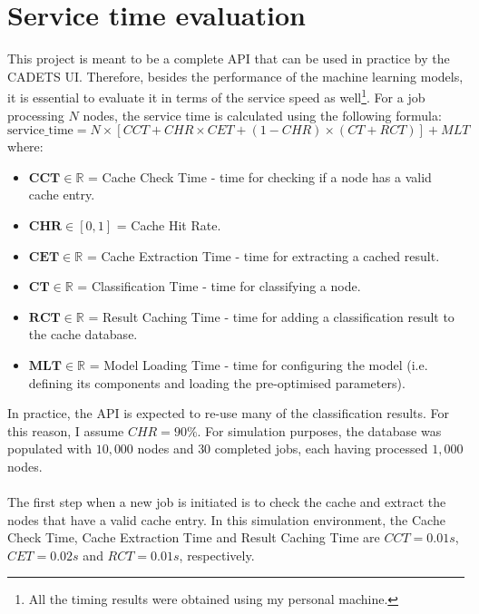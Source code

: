 		\section{Service time evaluation} \label{Section: eval/service-time}
			This project is meant to be a complete API that can be used in practice by the CADETS UI. Therefore, besides the performance of the machine learning models, it is essential to evaluate it in terms of the service speed as well\footnote{All the timing results were obtained using my personal machine.}. For a job processing $N$ nodes, the service time is calculated using the following formula:  
			\begin{equation}
				\text{service\_time} = N\times [CCT + CHR \times CET + (1-CHR) \times (CT + RCT)] + MLT
				\label{Eq: eval/service-time/overall}
			\end{equation}
			where: 
			\begin{itemize}
				\item $\mathbf{CCT} \in \mathbb{R}$ = Cache Check Time - time for checking if a node has a valid cache entry.
				\item $\mathbf{CHR} \in [0, 1]$ = Cache Hit Rate.
				\item $\textbf{CET} \in \mathbb{R}$ = Cache Extraction Time - time for extracting a cached result.
				\item $\textbf{CT} \in \mathbb{R}$ = Classification Time - time for classifying a node. 
				\item $\textbf{RCT} \in \mathbb{R}$ = Result Caching Time - time for adding a classification result to the cache database.
				\item $\mathbf{MLT} \in \mathbb{R}$ = Model Loading Time - time for configuring the model (i.e. defining its components and loading the pre-optimised parameters).
			\end{itemize}
			In practice, the API is expected to re-use many of the classification results. For this reason, I assume $CHR = 90\%$. For simulation purposes, the database was populated with $10, 000$ nodes and $30$ completed jobs, each having processed $1, 000$ nodes. 
			\\ \\
			The first step when a new job is initiated is to check the cache and extract the nodes that have a valid cache entry. In this simulation environment, the Cache Check Time, Cache Extraction Time and Result Caching Time are $CCT=0.01s$, $CET=0.02s$ and $RCT=0.01s$, respectively.  
			
